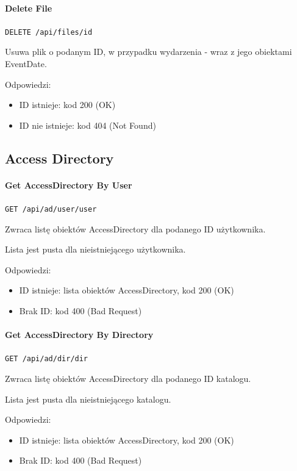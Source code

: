 \documentclass[a4paper,twoside,12pt]{book}
\begin{document}
\paragraph{Delete File}

\texttt{DELETE /api/files/{id}}

Usuwa plik o podanym ID, w przypadku wydarzenia - wraz z jego obiektami EventDate.

Odpowiedzi: 
\begin{itemize}
	\item ID istnieje: kod 200 (OK) 
	\item ID nie istnieje: kod 404 (Not Found)
\end{itemize}

\subsection{Access Directory}

\paragraph{Get AccessDirectory By User}

\texttt{GET /api/ad/user/{user}}

Zwraca listę obiektów AccessDirectory dla podanego ID użytkownika.

Lista jest pusta dla nieistniejącego użytkownika.

Odpowiedzi: 
\begin{itemize}
	\item ID istnieje: lista obiektów AccessDirectory, kod 200 (OK)
	\item Brak ID: kod 400 (Bad Request)
\end{itemize}

\paragraph{Get AccessDirectory By Directory}

\texttt{GET /api/ad/dir/{dir}}

Zwraca listę obiektów AccessDirectory dla podanego ID katalogu.

Lista jest pusta dla nieistniejącego katalogu.

Odpowiedzi: 
\begin{itemize}
	\item ID istnieje: lista obiektów AccessDirectory, kod 200 (OK)
	\item Brak ID: kod 400 (Bad Request)
\end{itemize}
\end{document}
